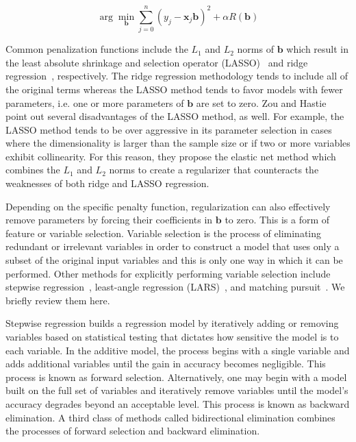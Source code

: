 \begin{equation}
\arg\min_{\mathbf{b}} \sum_{j=0}^n(y_j - \mathbf{x}_j\mathbf{b})^2 + \alpha R(\mathbf{b})
\label{eq:genericRegularization}
\end{equation}

Common penalization functions include the $L_1$ and $L_2$ norms of $\mathbf{b}$ which result in the least absolute shrinkage and selection operator (LASSO)~\cite{Tibshirani1996} and ridge regression~\cite{Hoerl1959,Hoerl1962}, respectively.
%
The ridge regression methodology tends to include all of the original terms whereas the LASSO method tends to favor models with fewer parameters, i.e. one or more parameters of $\mathbf{b}$ are set to zero.
%
Zou and Hastie~\cite{ZouHastie2005} point out several disadvantages of the LASSO method, as well.
%
For example, the LASSO method tends to be over aggressive in its parameter selection in cases where the dimensionality is larger than the sample size or if two or more variables exhibit collinearity.
%
For this reason, they propose the elastic net method which combines the $L_1$ and $L_2$ norms to create a regularizer that counteracts the weaknesses of both ridge and LASSO regression.

Depending on the specific penalty function, regularization can also effectively remove parameters by forcing their coefficients in $\mathbf{b}$ to zero.
%
This is a form of feature or variable selection.
%
Variable selection is the process of eliminating redundant or irrelevant variables in order to construct a model that uses only a subset of the original input variables and this is only one way in which it can be performed.
%
Other methods for explicitly performing variable selection include stepwise regression~\cite{DraperSmith2014}, least-angle regression (LARS)~\cite{EfronHastieJohnstone2004}, and matching pursuit~\cite{MallatZhang1993,DavisMallatZhang1994,PatiRezaiifarKrishnaprasad1993}.
%
We briefly review them here.

Stepwise regression builds a regression model by iteratively adding or removing variables based on statistical testing that dictates how sensitive the model is to each variable.
%
In the additive model, the process begins with a single variable and adds additional variables until the gain in accuracy becomes negligible.
%
This process is known as forward selection.
%
Alternatively, one may begin with a model built on the full set of variables and iteratively remove variables until the model's accuracy degrades beyond an acceptable level.
%
This process is known as backward elimination.
%
A third class of methods called bidirectional elimination combines the processes of forward selection and backward elimination.

